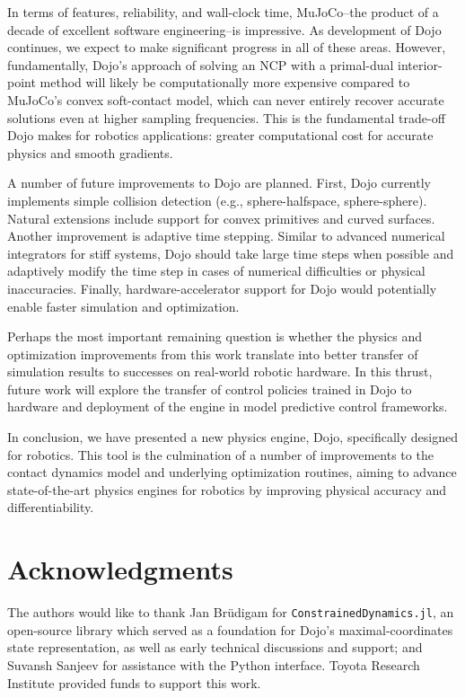 In terms of features, reliability, and wall-clock time, MuJoCo--the product of a decade of excellent software engineering--is impressive. As development of Dojo continues, we expect to make significant progress in all of these areas. However, fundamentally, Dojo's approach of solving an NCP with a primal-dual interior-point method will likely be computationally more expensive compared to MuJoCo's convex soft-contact model, which can never entirely recover accurate solutions even at higher sampling frequencies. This is the fundamental trade-off Dojo makes for robotics applications: greater computational cost for accurate physics and smooth gradients.

A number of future improvements to Dojo are planned. First, Dojo currently implements simple collision detection (e.g., sphere-halfspace, sphere-sphere). Natural extensions include support for convex primitives and curved surfaces. Another improvement is adaptive time stepping. Similar to advanced numerical integrators for stiff systems, Dojo should take large time steps when possible and adaptively modify the time step in cases of numerical difficulties or physical inaccuracies. Finally, hardware-accelerator support for Dojo would potentially enable faster simulation and optimization.

Perhaps the most important remaining question is whether the physics and optimization improvements from this work translate into better transfer of simulation results to successes on real-world robotic hardware. In this thrust, future work will explore the transfer of control policies trained in Dojo to hardware and deployment of the engine in model predictive control frameworks.

In conclusion, we have presented a new physics engine, Dojo, specifically designed for robotics. This tool is the culmination of a number of improvements to the contact dynamics model and underlying optimization routines, aiming to advance state-of-the-art physics engines for robotics by improving physical accuracy and differentiability. 

\section*{Acknowledgments}
The authors would like to thank Jan Br{\"u}digam for  \texttt{ConstrainedDynamics.jl}, an open-source library which served as a foundation for Dojo's maximal-coordinates state representation, as well as early technical discussions and support; and Suvansh Sanjeev for assistance with the Python interface. Toyota Research Institute provided funds to support this work. 

